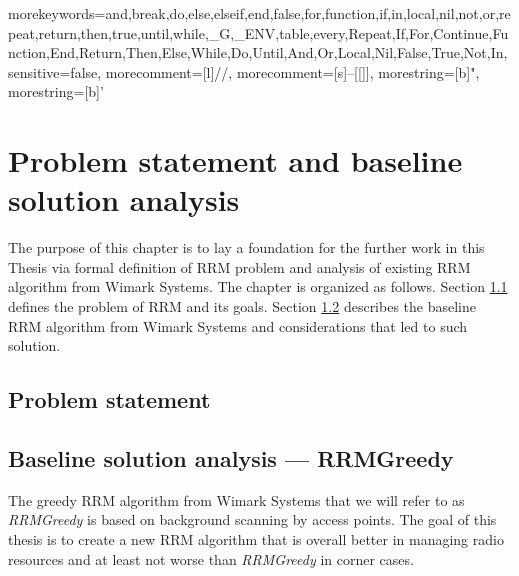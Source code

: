 

{
morekeywords={and,break,do,else,elseif,end,false,for,function,if,in,local,nil,not,or,repeat,return,then,true,until,while,_G,_ENV,table,every,Repeat,If,For,Continue,Function,End,Return,Then,Else,While,Do,Until,And,Or,Local,Nil,False,True,Not,In},
sensitive=false,
morecomment=[l]{//},
morecomment=[s]{--[[}{]]},
morestring=[b]",
morestring=[b]'
}

\lstset{style=mystyle}

\chapter{Problem statement and baseline solution analysis}
\label{chap:met}


The purpose of this chapter is to lay a foundation for the further work in this Thesis via formal definition of RRM problem and analysis of existing RRM algorithm from Wimark Systems. The chapter is organized as follows. Section \ref{sec:prob} defines the problem of RRM and its goals. Section \ref{sec:baseline} describes the baseline RRM algorithm from Wimark Systems and considerations that led to such solution.


\section{Problem statement}
\label{sec:prob}


\section{Baseline solution analysis --- RRMGreedy}
\label{sec:baseline}
The greedy RRM algorithm from Wimark Systems that we will refer to as \textit{RRMGreedy} is based on background scanning by access points. The goal of this thesis is to create a new RRM algorithm that is overall better in managing radio resources and at least not worse than \textit{RRMGreedy} in corner cases.

